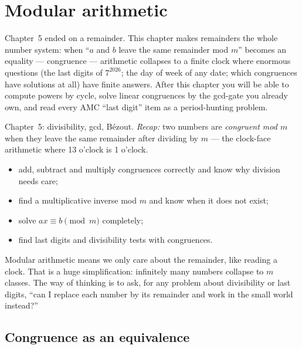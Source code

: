 \chapter{Modular arithmetic}\label{ch:mod}

Chapter~5 ended on a remainder. This chapter makes remainders the whole
number system: when ``$a$ and $b$ leave the same remainder mod $m$'' becomes
an equality --- congruence --- arithmetic collapses to a finite clock where
enormous questions (the last digits of $7^{2026}$; the day of week of any
date; which congruences have solutions at all) have finite answers. After
this chapter you will be able to compute powers by cycle, solve linear
congruences by the gcd-gate you already own, and read every AMC ``last
digit'' item as a period-hunting problem.

\begin{rulebox}
Chapter~5: divisibility, gcd, B\'ezout. \emph{Recap:} two numbers are \emph{congruent mod $m$} when they leave the same remainder after dividing by $m$ --- the clock-face arithmetic where 13 o'clock is 1 o'clock.
\end{rulebox}
\begin{wins}
\begin{itemize}
\item add, subtract and multiply congruences correctly and know why division needs care;
\item find a multiplicative inverse mod $m$ and know when it does not exist;
\item solve $ax\equiv b \pmod m$ completely;
\item find last digits and divisibility tests with congruences.
\end{itemize}
\end{wins}
\begin{principle}
Modular arithmetic means we only care about the remainder, like reading a clock. That is a huge simplification: infinitely many numbers collapse to $m$ classes. The way of thinking is to ask, for any problem about divisibility or last digits, ``can I replace each number by its remainder and work in the small world instead?''
\end{principle}

\section{Congruence as an equivalence}\label{sec:cong}

